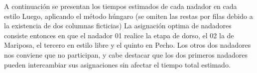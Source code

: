 
\begin{homeworkProblem}
A continuación se presentan los tiempos estimados de cada nadador en cada estilo
Luego, aplicando el método húngaro (se omiten las restas por filas debido a la existencia de dos columnas ficticias)
La asignación optima de nadadores consiste entonces en que el nadador 01 realice la etapa de dorso, el 02 la de Mariposa, el tercero en estilo libre y el quinto en Pecho. Los otros dos nadadores nos conviene que no participan, y cabe destacar que los dos primeros nadadores pueden intercambiar sus asignaciones sin afectar el tiempo total estimado.
\end{homeworkProblem}


